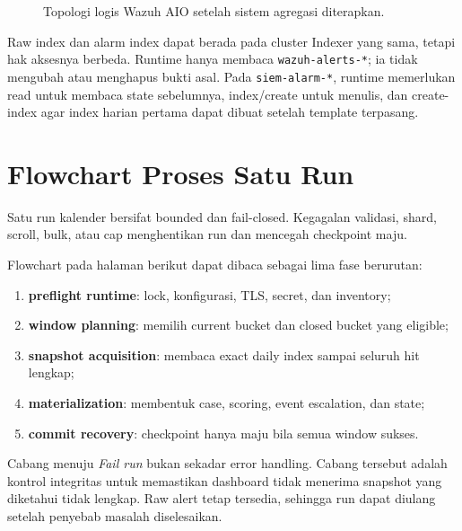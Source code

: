 \documentclass[11pt,a4paper,oneside]{report}
\DeclareRobustCommand{\code}[1]{\nolinkurl{#1}}
\begin{document}
\begin{figure}[ht]
{%
}
\caption{Topologi logis Wazuh AIO setelah sistem agregasi diterapkan.}
\end{figure}

Raw index dan alarm index dapat berada pada cluster Indexer yang sama, tetapi hak
aksesnya berbeda. Runtime hanya membaca \code{wazuh-alerts-*}; ia tidak mengubah
atau menghapus bukti asal. Pada \code{siem-alarm-*}, runtime memerlukan read untuk
membaca state sebelumnya, index/create untuk menulis, dan create-index agar index
harian pertama dapat dibuat setelah template terpasang.

\chapter{Flowchart Proses Satu Run}

Satu run kalender bersifat bounded dan fail-closed. Kegagalan validasi, shard,
scroll, bulk, atau cap menghentikan run dan mencegah checkpoint maju.

Flowchart pada halaman berikut dapat dibaca sebagai lima fase berurutan:

\begin{enumerate}
  \item \textbf{preflight runtime}: lock, konfigurasi, TLS, secret, dan inventory;
  \item \textbf{window planning}: memilih current bucket dan closed bucket yang eligible;
  \item \textbf{snapshot acquisition}: membaca exact daily index sampai seluruh hit lengkap;
  \item \textbf{materialization}: membentuk case, scoring, event escalation, dan state;
  \item \textbf{commit recovery}: checkpoint hanya maju bila semua window sukses.
\end{enumerate}

Cabang menuju \emph{Fail run} bukan sekadar error handling. Cabang tersebut adalah
kontrol integritas untuk memastikan dashboard tidak menerima snapshot yang diketahui
tidak lengkap. Raw alert tetap tersedia, sehingga run dapat diulang setelah penyebab
masalah diselesaikan.
\end{document}
